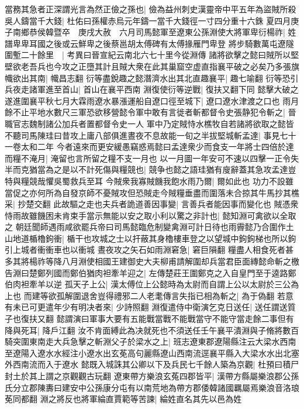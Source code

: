 當務其急者正深謂光言為然正儉之孫也|{
	儉為益州刺史漢靈帝中平五年為盜賊所殺}
吳人鑄當千大錢|{
	杜佑曰孫權赤烏元年鑄一當千大錢徑一寸四分重十六銖}
夏四月庚子南鄉恭侯韓暨卒　庚戌大赦　六月司馬懿軍至遼東公孫淵使大將軍卑衍楊祚|{
	姓譜卑卑耳國之後或云鮮卑之後蔡邕胡太傅碑有太傅掾雁門卑登}
將步騎數萬屯遼隧圍塹二十餘里　|{
	考異曰晉宣紀云南北六七十里今從淵傳}
諸將欲擊之懿曰賊所以堅壁欲老吾兵也今攻之正墮其計且賊大衆在此其巢窟空虚直指襄平破之必矣乃多張旗幟欲出其南|{
	幟昌志翻}
衍等盡銳趣之懿潛濟水出其北直趣襄平|{
	趣七喻翻}
衍等恐引兵夜走諸軍進至首山|{
	首山在襄平西南}
淵復使衍等逆戰|{
	復扶又翻下同}
懿擊大破之遂進圍襄平秋七月大霖雨遼水暴漲運船自遼口徑至城下|{
	遼口遼水津渡之口也}
雨月餘不止平地水數尺三軍恐欲移營懿令軍中敢有言徙者斬都督令史張静犯令斬之|{
	晉職官志魏制諸公加兵者置都督令史一人}
軍中乃定賊恃水樵牧自若諸將欲取之懿皆不聽司馬陳珪曰昔攻上庸八部俱進晝夜不息故能一旬之半拔堅城斬孟達|{
	事見七十一卷太和二年}
今者遠來而更安緩愚竊惑焉懿曰孟達衆少而食支一年將士四倍於達而糧不淹月|{
	淹留也言所留之糧不支一月也}
以一月圖一年安可不速以四擊一正令失半而克猶當為之是以不計死傷與糧競也|{
	競争也懿之語珪猶有廋辭蓋其急攻孟達豈特與糧競哉懼吳蜀救兵至耳}
今賊衆我寡賊饑我飽水雨乃爾|{
	爾如此也}
功力不設雖當促之亦何所為自發京師不憂賊攻但恐賊走今賊糧垂盡而圍落未合掠其牛馬抄其樵采|{
	抄楚交翻}
此故驅之走也夫兵者詭道善因事變|{
	言善兵者能因事而變化也}
賊憑衆恃雨故雖饑困未肯束手當示無能以安之取小利以驚之非計也|{
	懿知淵可禽欲以全取之}
朝廷聞師遇雨咸欲罷兵帝曰司馬懿臨危制變禽淵可計日待也雨霽懿乃合圍作土山地道楯櫓鉤衝|{
	楯干也攻城之士以扞蔽其身櫓樓車登之以望城中鉤鉤梯也所以鉤引上城者衝衝車也以衝城}
晝夜攻之矢石如雨淵窘急|{
	窘巨隕翻}
糧盡人相食死者甚多其將楊祚等降八月淵使相國王建御史大夫柳甫請解圍却兵當君臣面縳懿命斬之檄告淵曰楚鄭列國而鄭伯猶肉袒牽羊迎之|{
	左傳楚莊王圍鄭克之入自皇門至于逵路鄭伯肉袒牽羊以逆}
孤天子上公|{
	漢太傅位上公懿時為太尉而自謂上公以太尉於三公為上也}
而建等欲孤解圍退舍豈得禮邪二人老耄傳言失指已相為斬之|{
	為于偽翻}
若意有未已可更遣年少有明决者來|{
	少詩照翻}
淵復遣侍中衛演乞克日送任|{
	送任謂送質子也復扶又翻}
懿謂演曰軍事大要有五能戰當戰不能戰當守不能守當走餘二事但有降與死耳|{
	降戶江翻}
汝不肯面縛此為决就死也不須送任壬午襄平潰淵與子脩將數百騎突圍東南走大兵急擊之斬淵父子於梁水之上|{
	班志遼東郡遼陽縣注云大梁水西南至遼陽入遼水水經注小遼水出玄莬高句麗縣遼山西南流逕襄平縣入大梁水水出北塞外西南流而入于遼水}
懿既入城誅其公卿以下及兵民七千餘人築為京觀|{
	杜預曰積尸封土於其上謂之京觀觀古玩翻}
遼東帶方樂浪玄菟四郡皆平|{
	漢帶方縣屬樂浪郡公孫氏分立郡陳夀曰建安中公孫康分屯有以南荒地為帶方郡倭韓諸國羈屬焉樂浪音洛琅莬同都翻}
淵之將反也將軍綸直賈範等苦諫|{
	綸姓直名其先以邑為姓}
